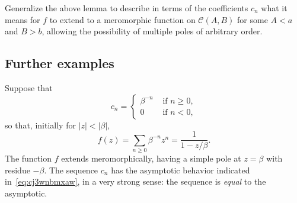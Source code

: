 \documentclass[reqno]{amsart}  \numberwithin{theorem}{section} \numberwithin{equation}{section}
\begin{document}
\begin{exercise}
  Generalize the above lemma to describe in terms of the coefficients $c_n$ what it means for $f$ to extend to a meromorphic function on $\mathcal{C}(A,B)$ for some $A < a$ and $B > b$, allowing the possibility of multiple poles of arbitrary order.
\end{exercise}

\subsection{Further examples}


\begin{example}
  Suppose that
  \begin{equation*}
    c_n =
    \begin{cases}
      \beta^{- n} & \text{ if } n \geq 0, \\
      0 & \text{ if } n < 0,
    \end{cases}
  \end{equation*}
  so that, initially for $\lvert z \rvert < |\beta|$,
  \begin{equation*}
    f (z) = \sum_{n \geq 0} \beta^{-n} z^n = \frac{1}{1 - z / \beta }.
  \end{equation*}
  The function $f$ extends meromorphically, having a simple pole at $z = \beta$ with residue $-\beta$.  The sequence $c_n$ has the asymptotic behavior indicated in~\eqref{eq:cj3wnbmxaw}, in a very strong sense: the sequence is \emph{equal} to the asymptotic.
\end{example}
\end{document}
